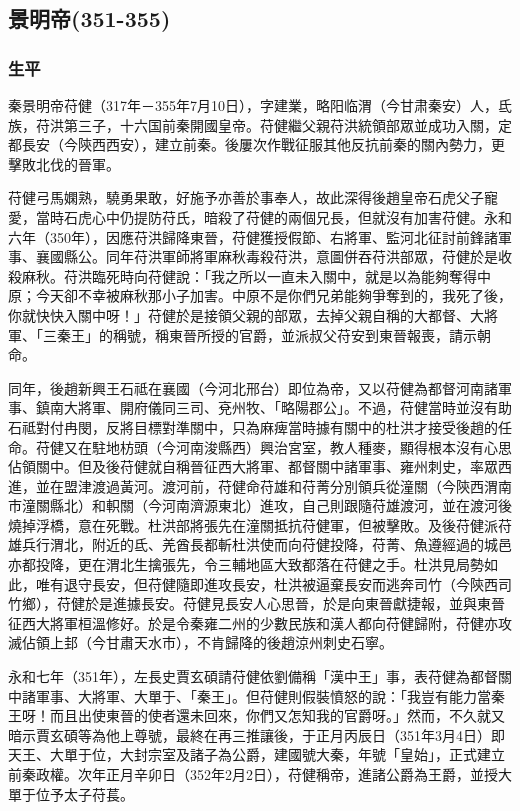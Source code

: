 
\subsection{景明帝\tiny(351-355)}

\subsubsection{生平}

秦景明帝苻健（317年－355年7月10日），字建業，略阳临渭（今甘肃秦安）人，氐族，苻洪第三子，十六国前秦開國皇帝。苻健繼父親苻洪統領部眾並成功入關，定都長安（今陝西西安），建立前秦。後屢次作戰征服其他反抗前秦的關內勢力，更擊敗北伐的晉軍。

苻健弓馬嫻熟，驍勇果敢，好施予亦善於事奉人，故此深得後趙皇帝石虎父子寵愛，當時石虎心中仍提防苻氏，暗殺了苻健的兩個兄長，但就沒有加害苻健。永和六年（350年），因應苻洪歸降東晉，苻健獲授假節、右將軍、監河北征討前鋒諸軍事、襄國縣公。同年苻洪軍師將軍麻秋毒殺苻洪，意圖併吞苻洪部眾，苻健於是收殺麻秋。苻洪臨死時向苻健說：「我之所以一直未入關中，就是以為能夠奪得中原；今天卻不幸被麻秋那小子加害。中原不是你們兄弟能夠爭奪到的，我死了後，你就快快入關中呀！」苻健於是接領父親的部眾，去掉父親自稱的大都督、大將軍、「三秦王」的稱號，稱東晉所授的官爵，並派叔父苻安到東晉報喪，請示朝命。

同年，後趙新興王石祗在襄國（今河北邢台）即位為帝，又以苻健為都督河南諸軍事、鎮南大將軍、開府儀同三司、兗州牧、「略陽郡公」。不過，苻健當時並沒有助石祗對付冉閔，反將目標對準關中，只為麻痺當時據有關中的杜洪才接受後趙的任命。苻健又在駐地枋頭（今河南浚縣西）興治宮室，教人種麥，顯得根本沒有心思佔領關中。但及後苻健就自稱晉征西大將軍、都督關中諸軍事、雍州刺史，率眾西進，並在盟津渡過黃河。渡河前，苻健命苻雄和苻菁分別領兵從潼關（今陝西渭南市潼關縣北）和軹關（今河南濟源東北）進攻，自己則跟隨苻雄渡河，並在渡河後燒掉浮橋，意在死戰。杜洪部將張先在潼關抵抗苻健軍，但被擊敗。及後苻健派苻雄兵行渭北，附近的氐、羌酋長都斬杜洪使而向苻健投降，苻菁、魚遵經過的城邑亦都投降，更在渭北生擒張先，令三輔地區大致都落在苻健之手。杜洪見局勢如此，唯有退守長安，但苻健隨即進攻長安，杜洪被逼棄長安而逃奔司竹（今陝西司竹鄉），苻健於是進據長安。苻健見長安人心思晉，於是向東晉獻捷報，並與東晉征西大將軍桓溫修好。於是令秦雍二州的少數民族和漢人都向苻健歸附，苻健亦攻滅佔領上邽（今甘肅天水市），不肯歸降的後趙涼州刺史石寧。

永和七年（351年），左長史賈玄碩請苻健依劉備稱「漢中王」事，表苻健為都督關中諸軍事、大將軍、大單于、「秦王」。但苻健則假裝憤怒的說：「我豈有能力當秦王呀！而且出使東晉的使者還未回來，你們又怎知我的官爵呀。」然而，不久就又暗示賈玄碩等為他上尊號，最終在再三推讓後，于正月丙辰日（351年3月4日）即天王、大單于位，大封宗室及諸子為公爵，建國號大秦，年號「皇始」，正式建立前秦政權。次年正月辛卯日（352年2月2日），苻健稱帝，進諸公爵為王爵，並授大單于位予太子苻萇。

